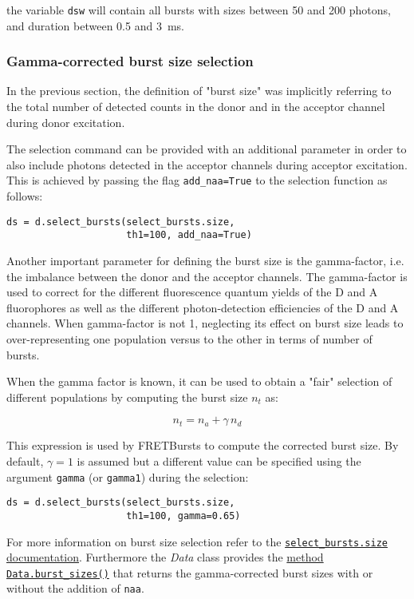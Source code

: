 the variable \verb|dsw| will contain all bursts with sizes between 50 and
200 photons, and duration between 0.5 and 3~ms.

\subsubsection{Gamma-corrected burst size selection}

In the previous section, the definition of "burst size" was implicitly referring
to the total number of detected counts in the donor and in the acceptor channel
during donor excitation.

The selection command can be provided with an additional parameter in order to
also include photons detected in the acceptor channels during acceptor excitation.
This is achieved by passing the flag \verb|add_naa=True| to the selection function
as follows:

\begin{verbatim}
ds = d.select_bursts(select_bursts.size,
                     th1=100, add_naa=True)
\end{verbatim}

Another important parameter for defining the burst size is the gamma-factor, i.e.
the imbalance between the donor and the acceptor channels. The gamma-factor is
used to correct for the different fluorescence quantum yields of the D and A
fluorophores as well as the different photon-detection efficiencies of the D and A channels.
When gamma-factor is not 1, neglecting its effect on burst size leads to
over-representing one population versus to the other in terms of number of bursts.

When the gamma factor is known, it can be used to obtain a "fair" selection
of different populations by computing the burst size $n_t$ as:

$$ n_t = n_a + \gamma\,n_d$$ 

This expression is used by FRETBursts to compute the corrected burst size.
By default, $\gamma=1$ is assumed but a different value can be specified
using the argument \verb|gamma| (or \verb|gamma1|) during the selection:

\begin{verbatim}
ds = d.select_bursts(select_bursts.size,
                     th1=100, gamma=0.65)
\end{verbatim}

For more information on burst size selection refer to the
\href{http://fretbursts.readthedocs.org/en/latest/burst_selection.html#fretbursts.select\_bursts.size}{\texttt{select\_bursts.size} documentation}. Furthermore the \textit{Data} class provides the
\href{http://fretbursts.readthedocs.org/en/latest/data_class.html#fretbursts.burstlib.Data.burst_sizes}{method \texttt{Data.burst\_sizes()}} that returns the gamma-corrected burst sizes with or
without the addition of \verb|naa|.

